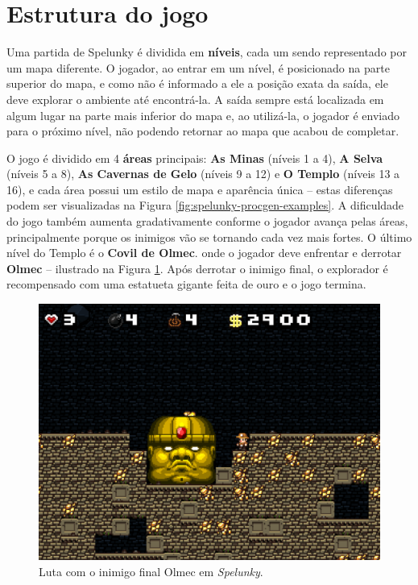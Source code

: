 \section{\label{section:spelunky-structure}Estrutura do jogo}
Uma partida de Spelunky é dividida em \textbf{níveis}, cada um sendo
representado por um mapa diferente. O jogador, ao entrar em um nível, é
posicionado na parte superior do mapa, e como não é informado a ele a posição
exata da saída, ele deve explorar o ambiente até encontrá-la. A saída sempre
está localizada em algum lugar na parte mais inferior do mapa e, ao utilizá-la,
o jogador é enviado para o próximo nível, não podendo retornar ao mapa que
acabou de completar.

O jogo é dividido em 4 \textbf{áreas} principais: \textbf{As Minas} (níveis 1 a
4), \textbf{A Selva} (níveis 5 a 8), \textbf{As Cavernas de Gelo} (níveis 9 a
12) e \textbf{O Templo} (níveis 13 a 16), e cada área possui um estilo de mapa e
aparência única -- estas diferenças podem ser visualizadas na Figura
\ref{fig:spelunky-procgen-examples}. A dificuldade do jogo também aumenta
gradativamente conforme o jogador avança pelas áreas, principalmente porque os
inimigos vão se tornando cada vez mais fortes. O último nível do Templo é o
\textbf{Covil de Olmec}. onde o jogador deve enfrentar e derrotar \textbf{Olmec}
-- ilustrado na Figura \ref{fig:spelunky-olmec}. Após derrotar o inimigo final,
o explorador é recompensado com uma estatueta gigante feita de ouro e o jogo
termina.

\begin{figure}[htb!]
\centering
\includegraphics[width=.65\textwidth]{fig/spelunky-olmec.pdf}
\caption{Luta com o inimigo final Olmec em \textit{Spelunky}.}
\label{fig:spelunky-olmec}
\end{figure}

